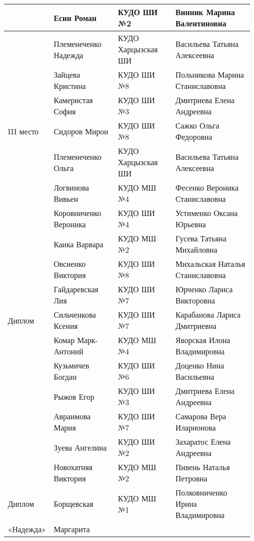 \begin{longtable}{|l|l|l|l|}
\hline           & Есин Роман           & КУДО ШИ №2         & Винник Марина Валентиновна                \\
\hline           & Племенеченко Надежда & КУДО Харцызская ШИ & Васильева Татьяна Алексеевна              \\
\hline           & Зайцева Кристина     & КУДО ШИ №8         & Польникова Марина Станиславовна           \\
\hline           & Камеристая София     & КУДО ШИ №3         & Дмитриева Елена Андреевна                 \\
\hline III место  & Сидоров Мирон         & КУДО ШИ №8         & Сажко Ольга Федоровна                   \\
\hline            & Племенеченко Ольга    & КУДО Харцызская ШИ & Васильева Татьяна Алексеевна            \\
\hline            & Логвинова Вивьен      & КУДО МШ №4         & Фесенко Вероника Станиславовна          \\
\hline            & Коровниченко Вероника & КУДО ШИ №4         & Устименко Оксана Юрьевна                \\
\hline            & Каика Варвара         & КУДО МШ №2         & Гусева Татьяна Михайловна               \\
\hline            & Овсиенко Виктория     & КУДО ШИ №8         & Михальская Наталья Станиславовна        \\
\hline            & Гайдаревская Лия      & КУДО ШИ №7         & Юрченко Лариса Викторовна               \\
\hline Диплом     & Сильченкова Ксения    & КУДО ШИ №7         & Карабанова Лариса Дмитриевна            \\
\hline            & Комар Марк-Антоний    & КУДО МШ №4         & Яворская Илона Владимировна             \\
\hline            & Кузьмичев Богдан      & КУДО ШИ №6         & Доценко Нина Васильевна                 \\
\hline            & Рыжов Егор            & КУДО ШИ №3         & Дмитриева Елена Андреевна               \\
\hline            & Авраимова Мария       & КУДО ШИ №7         & Самарова Вера Иларионова                \\
\hline            & Зуева Ангелина        & КУДО ШИ №2         & Захаратос Елена Андреевна               \\
\hline            & Новохатняя Виктория   & КУДО МШ №2         & Пивень Наталья Петровна                 \\
\hline Диплом     & Борщевская            & КУДО МШ №1         & Полковниченко Ирина Владимировна        \\
\hline «Надежда»  & Маргарита & & \\
\hline \end{longtable}
